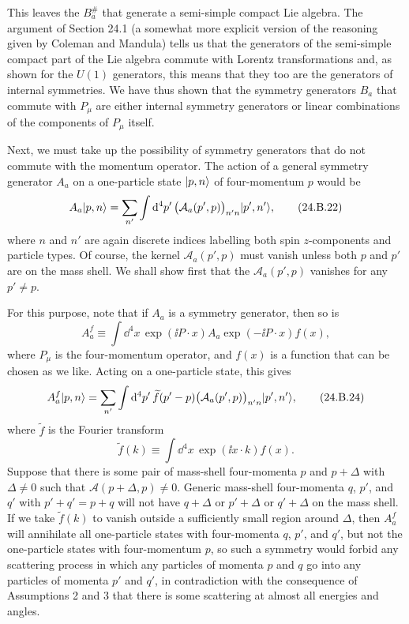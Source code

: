 This leaves the $B_a^\#$ that generate a semi-simple compact Lie algebra.
The argument of Section 24.1 (a somewhat more explicit version of the
reasoning given by Coleman and Mandula) tells us that the generators of the
semi-simple compact part of the Lie algebra commute with Lorentz
transformations and, as shown for the $U(1)$ generators, this means that they
too are the generators of internal symmetries. We have thus shown that the
symmetry generators $B_a$ that commute with $P_\mu$ are either internal
symmetry generators or linear combinations of the components of $P_\mu$
itself.

Next, we must take up the possibility of symmetry generators that do not
commute with the momentum operator. The action of a general symmetry generator
$A_a$ on a one-particle state $\lvert p,n\rangle$ of four-momentum $p$ would be
\begin{equation}
 A_a\lvert p,n\rangle
 =\sum_{n'}\int \mathop{}\!\mathrm{d}^4p'\,
 \bigl(\mathcal{A}_a(p',p)\bigr)_{n'n}\lvert p',n'\rangle,
\tag{24.B.22}\label{eq:24.B.22}
\end{equation}
where $n$ and $n'$ are again discrete indices labelling both spin
$z$-components and particle types. Of course, the kernel
$\mathcal{A}_a(p',p)$ must vanish unless both $p$ and $p'$ are on the
mass shell. We shall show first that the $\mathcal{A}_a(p',p)$ vanishes
for any $p'\ne p$.

For this purpose, note that if $A_a$ is a symmetry generator, then so is
\begin{equation}
 A_a^f\equiv\int \dd^4x\,
 \exp(\ii P\cdot x)A_a\exp(-\ii P\cdot x)f(x),
\tag{24.B.23}\label{eq:24.B.23}
\end{equation}
where $P_\mu$ is the four-momentum operator, and $f(x)$ is a function that can
be chosen as we like. Acting on a one-particle state, this gives
\begin{equation}
 A_a^f\lvert p,n\rangle
 =\sum_{n'}\int \mathop{}\!\mathrm{d}^4p'\,\widetilde f(p'-p)
 \bigl(\mathcal{A}_a(p',p)\bigr)_{n'n}\lvert p',n'\rangle,
\tag{24.B.24}\label{eq:24.B.24}
\end{equation}
where $\widetilde f$ is the Fourier transform
\begin{equation}
 \widetilde f(k)\equiv\int \dd^4x\,\exp(\ii x\cdot k)f(x).
\tag{24.B.25}\label{eq:24.B.25}
\end{equation}
Suppose that there is some pair of mass-shell four-momenta $p$ and $p+\Delta$
with $\Delta\ne0$ such that $\mathcal{A}(p+\Delta,p)\ne0$. Generic mass-shell
four-momenta $q$, $p'$, and $q'$ with $p'+q'=p+q$ will not have $q+\Delta$ or
$p'+\Delta$ or $q'+\Delta$ on the mass shell. If we take $\widetilde f(k)$ to
vanish outside a sufficiently small region around $\Delta$, then $A_a^f$
will annihilate all one-particle states with four-momenta $q$, $p'$, and $q'$,
but not the one-particle states with four-momentum $p$, so such a symmetry
would forbid any scattering process in which any particles of momenta $p$ and
$q$ go into any particles of momenta $p'$ and $q'$, in contradiction with the
consequence of Assumptions 2 and 3 that there is some scattering at almost all
energies and angles.

